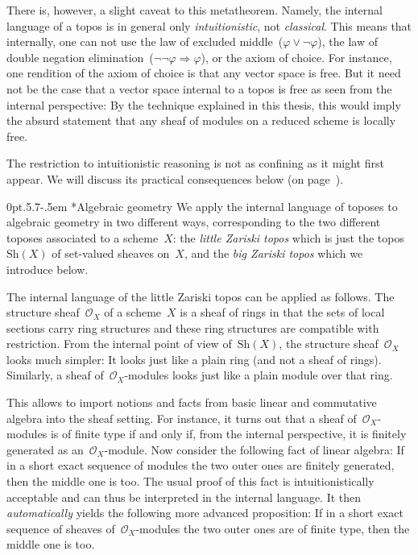 \documentclass[10pt,reqno,a4paper]{amsbook}
\makeatletter
\theoremstyle{definition}
\theoremstyle{plain}
\theoremstyle{remark}
\renewcommand{\O}{\mathcal{O}}
\newcommand{\Sh}{\mathrm{Sh}}
\newcommand{\?}{\,{:}\,}
\renewcommand{\_}{\mathpunct{.}\,}
\def\subsection{\@startsection{subsection}{2}%
  {0pt}{.5\linespacing\@plus.7\linespacing}{-.5em}%
  {\normalfont\bfseries}}
\makeatother
\begin{document}
{There is, however, a slight caveat to this metatheorem. Namely, the internal
language of a topos is in general only \emph{intuitionistic}, not
\emph{classical}. This means that internally, one can not use the law of
excluded middle~($\varphi \vee \neg\varphi$), the law of double negation
elimination~($\neg\neg\varphi \Rightarrow \varphi$), or the axiom of choice.
For instance, one rendition of the axiom of choice is that any vector space is
free. But it need not be the case that a vector space internal to a topos
is free as seen from the internal perspective: By the technique explained in
this thesis, this would imply the absurd statement that any sheaf of modules on
a reduced scheme is locally free.

The restriction to intuitionistic reasoning is not as confining as it might first
appear. We will discuss its practical consequences below (on
page~\pageref{sect:appreciating-intuitionistic-logic}).


\subsection*{Algebraic geometry}
We apply the internal language of toposes to algebraic geometry in two
different ways, corresponding to the two different toposes associated to a
scheme~$X$: the \emph{little Zariski topos} which is just the topos~$\Sh(X)$ of
set-valued sheaves on~$X$, and the \emph{big Zariski topos} which we introduce
below.

The internal language of the little Zariski topos can be applied as follows.
The structure sheaf~$\O_X$ of a scheme~$X$ is a sheaf of rings in that the sets of
local sections carry ring structures and these ring structures are compatible
with restriction. From the internal point of view of~$\Sh(X)$,
the structure
sheaf~$\O_X$ looks much simpler: It looks just like a plain ring (and
not a sheaf of rings). Similarly, a sheaf of~$\O_X$-modules looks just like a
plain module over that ring.

This allows to import notions and facts from basic linear and commutative
algebra into the sheaf setting. For instance, it turns out that a sheaf
of~$\O_X$-modules is of finite type if and only if, from the internal
perspective, it is finitely generated as an~$\O_X$-module. Now consider the
following fact of linear algebra: If in a short exact sequence of modules the two
outer ones are finitely generated, then the middle one is too. The usual proof of
this fact is intuitionistically acceptable and can thus be interpreted in the
internal language. It then \emph{automatically} yields the following more advanced
proposition: If in a short exact sequence of sheaves of~$\O_X$-modules the
two outer ones are of finite type, then the middle one is too.

}
\end{document}
